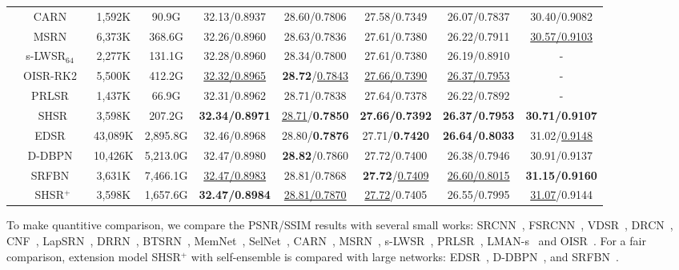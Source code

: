 \documentclass[manuscript,screen]{acmart}
\begin{document}
\begin{table*}[t]
\begin{tabular}{|c|c|c|c|c|c|c|c|c|}
		&CARN~\cite{carn_eccv2018}&1,592K&90.9G& 
		32.13/0.8937& 28.60/0.7806& 27.58/0.7349& 26.07/0.7837& 30.40/0.9082\\
		
		&MSRN~\cite{msrn_eccv2018}&6,373K& 368.6G& 
		32.26/0.8960& 28.63/0.7836& 27.61/0.7380& 26.22/0.7911& \underline{30.57/0.9103} \\
		
		& s-LWSR$_{64}$~\cite{s_LWSR_tip2020}& 2,277K& 131.1G&
		32.28/0.8960& 28.34/0.7800& 27.61/0.7380& 26.19/0.8910& - \\
		
		&OISR-RK2~\cite{oisr_cvpr2019}&5,500K&412.2G&
		\underline{32.32/0.8965}& \textbf{28.72}/\underline{0.7843}& \underline{27.66/0.7390}& \underline{26.37/0.7953}& - \\
		
		&PRLSR~\cite{prlsr_icassp2020}& 1,437K& 66.9G&
		32.31/0.8962& 28.71/0.7838& 27.64/0.7378& 26.22/0.7892& - \\
		
		&SHSR&3,598K& 207.2G& 
		\textbf{32.34/0.8971}& \underline{28.71}/\textbf{0.7850}& \textbf{27.66/0.7392}& \textbf{26.37/0.7953}& \textbf{30.71/0.9107}  \\
		
		\cline{2-9}
		
		&EDSR~\cite{edsr_cvpr2017}&43,089K& 2,895.8G& 32.46/0.8968& 28.80/\textbf{0.7876}& 27.71/\textbf{0.7420}& \textbf{26.64/0.8033}& 31.02/\underline{0.9148}\\
		
		&D-DBPN~\cite{dbpn_pami2020}&10,426K& 5,213.0G& 32.47/0.8980& \textbf{28.82}/0.7860& 27.72/0.7400& 26.38/0.7946&30.91/0.9137\\
		
		&SRFBN~\cite{srfbn_cvpr2019}&3,631K& 7,466.1G& \underline{32.47/0.8983}& 28.81/0.7868& \textbf{27.72}/\underline{0.7409}& \underline{26.60/0.8015}& \textbf{31.15/0.9160}\\
		


		&SHSR$^+$&3,598K& 1,657.6G&\textbf{32.47/0.8984}& \underline{28.81/0.7870}& \underline{27.72}/0.7405& 26.55/0.7995& \underline{31.07}/0.9144 \\
		\hline
		
	\end{tabular}
\end{table*}

To make quantitive comparison, we compare the PSNR/SSIM results with several small works: SRCNN~\cite{srcnn_pami2016}, FSRCNN~\cite{fsrcnn_eccv2016}, VDSR~\cite{vdsr_cvpr2016}, DRCN~\cite{drcn_cvpr2016}, CNF~\cite{cnf_cvprw2017}, LapSRN~\cite{lapsrn_cvpr2017}, DRRN~\cite{drrn_cvpr2017}, BTSRN~\cite{btsrn_cvprw2017}, MemNet~\cite{memnet_iccv2017}, SelNet~\cite{selnet_cvprw2017}, CARN~\cite{carn_eccv2018}, MSRN~\cite{msrn_eccv2018}, s-LWSR~\cite{s_LWSR_tip2020}, PRLSR~\cite{prlsr_icassp2020}, LMAN-s~\cite{lman_tob2020} and OISR~\cite{oisr_cvpr2019}. 
For a fair comparison, extension model SHSR$^+$ with self-ensemble is compared with large networks: EDSR~\cite{edsr_cvpr2017}, D-DBPN~\cite{dbpn_pami2020}, and SRFBN~\cite{srfbn_cvpr2019}. 
\end{document}
